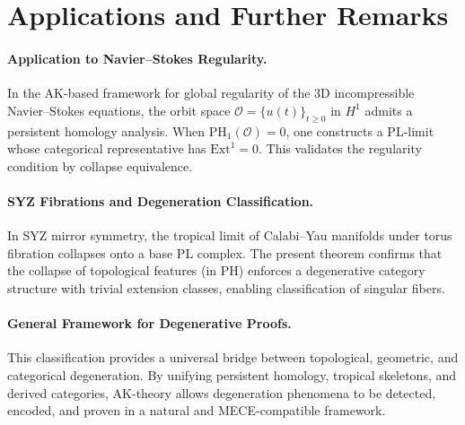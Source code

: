 \documentclass[11pt]{article}
\begin{document}
\section{Applications and Further Remarks}

\paragraph{Application to Navier--Stokes Regularity.}
In the AK-based framework for global regularity of the 3D incompressible Navier--Stokes equations, the orbit space $\mathcal{O} = \{ u(t) \}_{t \geq 0}$ in $H^1$ admits a persistent homology analysis. When $\mathrm{PH}_1(\mathcal{O}) = 0$, one constructs a PL-limit whose categorical representative has $\mathrm{Ext}^1 = 0$. This validates the regularity condition by collapse equivalence.

\paragraph{SYZ Fibrations and Degeneration Classification.}
In SYZ mirror symmetry, the tropical limit of Calabi--Yau manifolds under torus fibration collapses onto a base PL complex. The present theorem confirms that the collapse of topological features (in PH) enforces a degenerative category structure with trivial extension classes, enabling classification of singular fibers.

\paragraph{General Framework for Degenerative Proofs.}
This classification provides a universal bridge between topological, geometric, and categorical degeneration. By unifying persistent homology, tropical skeletons, and derived categories, AK-theory allows degeneration phenomena to be detected, encoded, and proven in a natural and MECE-compatible framework.
\end{document}
